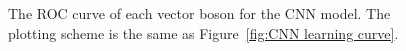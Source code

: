 \documentclass[12pt]{article}
\begin{document}
		\begin{figure}[htpb]
			\centering
			\caption{The ROC curve of each vector boson for the CNN model. The plotting scheme is the same as Figure~\ref{fig:CNN learning curve}.}
			\label{fig:CNN roc curve}
		\end{figure}
		
\end{document}
